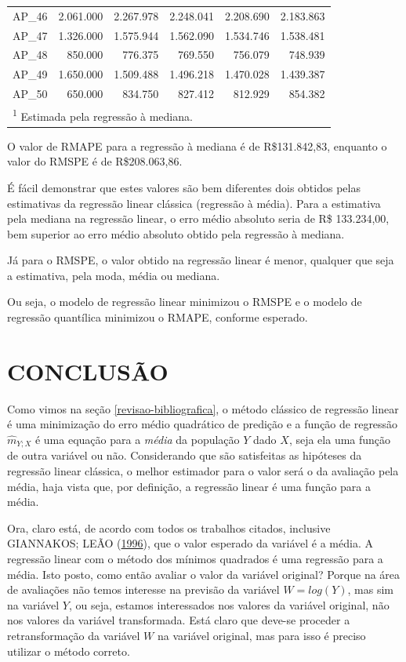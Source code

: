 \documentclass[a4paper]{article}
\begin{document}
\begin{table}
\begin{tabular}[t]{lrrrrr}
\addlinespace
AP\_46 & 2.061.000 & 2.267.978 & 2.248.041 & 2.208.690 & 2.183.863\\
AP\_47 & 1.326.000 & 1.575.944 & 1.562.090 & 1.534.746 & 1.538.481\\
AP\_48 & 850.000 & 776.375 & 769.550 & 756.079 & 748.939\\
AP\_49 & 1.650.000 & 1.509.488 & 1.496.218 & 1.470.028 & 1.439.387\\
AP\_50 & 650.000 & 834.750 & 827.412 & 812.929 & 854.382\\
\bottomrule
\multicolumn{6}{l}{\textsuperscript{1} Estimada pela regressão à mediana.}\\
\end{tabular}
\end{table}


O valor de RMAPE para a regressão à mediana é de R\$131.842,83, enquanto
o valor do RMSPE é de R\$208.063,86.

É fácil demonstrar que estes valores são bem diferentes dois obtidos
pelas estimativas da regressão linear clássica (regressão à média). Para
a estimativa pela mediana na regressão linear, o erro médio absoluto
seria de R\$ 133.234,00, bem superior ao erro médio absoluto obtido pela
regressão à mediana.

Já para o RMSPE, o valor obtido na regressão linear é menor, qualquer
que seja a estimativa, pela moda, média ou mediana.

Ou seja, o modelo de regressão linear minimizou o RMSPE e o modelo de
regressão quantílica minimizou o RMAPE, conforme esperado.

\section{CONCLUSÃO}\label{conclusao}

Como vimos na seção \ref{revisao-bibliografica}, o método clássico de
regressão linear é uma minimização do erro médio quadrático de predição
e a função de regressão \(\hat{m}_{Y;X}\) é uma equação para a
\emph{média} da população \(Y\) dado \(X\), seja ela uma função de outra
variável ou não. Considerando que são satisfeitas as hipóteses da
regressão linear clássica, o melhor estimador para o valor será o da
avaliação pela média, haja vista que, por definição, a regressão linear
é uma função para a média.

Ora, claro está, de acordo com todos os trabalhos citados, inclusive
GIANNAKOS; LEÃO (\protect\hyperlink{ref-giannakos}{1996}), que o valor
esperado da variável é a média. A regressão linear com o método dos
mínimos quadrados é uma regressão para a média. Isto posto, como então
avaliar o valor da variável original? Porque na área de avaliações não
temos interesse na previsão da variável \(W = log(Y)\), mas sim na
variável \(Y\), ou seja, estamos interessados nos valores da variável
original, não nos valores da variável transformada. Está claro que
deve-se proceder a retransformação da variável \(W\) na variável
original, mas para isso é preciso utilizar o método correto.
\end{document}
